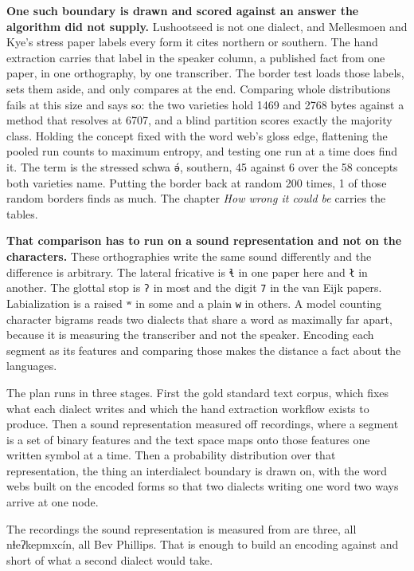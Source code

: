 \textbf{One such boundary is drawn and scored against an answer the algorithm did not supply.} Lushootseed is not one dialect, and Mellesmoen and Kye's stress paper \cite{src:Mellesmoen-and-Kye-2026} labels every form it cites northern or southern. The hand extraction carries that label in the speaker column, a published fact from one paper, in one orthography, by one transcriber. The border test loads those labels, sets them aside, and only compares at the end. Comparing whole distributions fails at this size and says so: the two varieties hold 1469 and 2768 bytes against a method that resolves at 6707, and a blind partition scores exactly the majority class. Holding the concept fixed with the word web's gloss edge, flattening the pooled run counts to maximum entropy, and testing one run at a time does find it. The term is the stressed schwa \texttt{ə́}, southern, 45 against 6 over the 58 concepts both varieties name. Putting the border back at random 200 times, 1 of those random borders finds as much. The chapter \emph{How wrong it could be} carries the tables.

\textbf{That comparison has to run on a sound representation and not on the characters.} These orthographies write the same sound differently and the difference is arbitrary. The lateral fricative is \texttt{ɬ} in one paper here and \texttt{ł} in another. The glottal stop is \texttt{ʔ} in most and the digit \texttt{7} in the van Eijk papers. Labialization is a raised \texttt{ʷ} in some and a plain \texttt{w} in others. A model counting character bigrams reads two dialects that share a word as maximally far apart, because it is measuring the transcriber and not the speaker. Encoding each segment as its features and comparing those makes the distance a fact about the languages.

The plan runs in three stages. First the gold standard text corpus, which fixes what each dialect writes and which the hand extraction workflow exists to produce. Then a sound representation measured off recordings, where a segment is a set of binary features and the text space maps onto those features one written symbol at a time. Then a probability distribution over that representation, the thing an interdialect boundary is drawn on, with the word webs built on the encoded forms so that two dialects writing one word two ways arrive at one node.

The recordings the sound representation is measured from are three, all nɬeʔkepmxcín, all Bev Phillips. That is enough to build an encoding against and short of what a second dialect would take.

